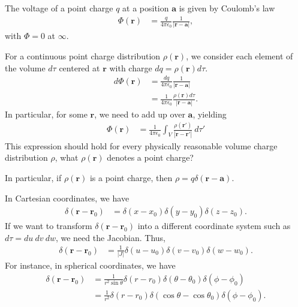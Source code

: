 \documentclass[10pt]{mypackage}
\begin{document}
\begin{example}
  The voltage of a point charge $q$ at a position $\mathbf{a}$ is given by Coulomb's law
  \begin{align*}
    \Phi(\mathbf{r}) &= \frac{q}{4\pi \epsilon_0} \frac{1}{\left\vert \mathbf{r} - \mathbf{a} \right\vert},
  \end{align*}
  with $\Phi = 0$ at $\infty$.\newline

  For a continuous point charge distribution $\rho\left(\mathbf{r}\right)$, we consider each element of the volume $d\tau$ centered at $\mathbf{r}$ with charge $dq = \rho\left(\mathbf{r}\right)d\tau$.
  \begin{align*}
    d\Phi\left(\mathbf{r}\right) &= \frac{dq}{4\pi \epsilon_0}\frac{1}{\left\vert \mathbf{r} - \mathbf{a} \right\vert}\\
                                 &= \frac{1}{4\pi\epsilon_0}\frac{\rho\left(\mathbf{r}\right)d\tau}{\left\vert \mathbf{r} - \mathbf{a} \right\vert}.
  \end{align*}
  In particular, for some $\mathbf{r}$, we need to add up over $\mathbf{a}$, yielding
  \begin{align*}
    \Phi\left(\mathbf{r}\right) &= \frac{1}{4\pi\epsilon_0}\int_{V}^{} \frac{\rho\left(\mathbf{r}'\right)}{\left\vert \mathbf{r} - \mathbf{r}' \right\vert}\:d\tau'
  \end{align*}
  This expression should hold for every physically reasonable volume charge distribution $\rho$, what $\rho\left(\mathbf{r}\right)$ denotes a point charge?\newline

  In particular, if $\rho\left(\mathbf{r}\right)$ is a point charge, then $\rho = q\delta\!\left(\mathbf{r} - \mathbf{a}\right)$.
\end{example}
\begin{example}
  In Cartesian coordinates, we have
  \begin{align*}
    \delta\!\left(\mathbf{r} - \mathbf{r}_0\right) &= \delta\!\left(x-x_0\right)\delta\!\left(y-y_0\right)\delta\!\left(z-z_0\right).
  \end{align*}
  If we want to transform $\delta\!\left(\mathbf{r} - \mathbf{r}_0\right)$ into a different coordinate system such as $d\tau = du\:dv\:dw$, we need the Jacobian. Thus,
  \begin{align*}
    \delta\!\left(\mathbf{r} - \mathbf{r}_0\right) &= \frac{1}{|J|}\delta\!\left(u-u_0\right)\delta\!\left(v-v_0\right)\delta\!\left(w-w_0\right).
  \end{align*}
  For instance, in spherical coordinates, we have
  \begin{align*}
    \delta\!\left(\mathbf{r} - \mathbf{r}_0\right) &= \frac{1}{r^2\sin\theta}\delta\!\left(r-r_0\right)\delta\!\left(\theta - \theta_0\right)\delta\!\left(\phi-\phi_0\right)\\
                                                 &= \frac{1}{r^2}\delta\!\left(r-r_0\right)\delta\!\left(\cos\theta - \cos\theta_0\right)\delta\!\left(\phi-\phi_0\right).
  \end{align*}
\end{example}
\end{document}
